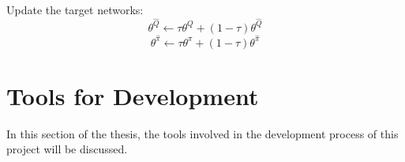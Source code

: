 \documentclass[12pt,twoside,a4]{mwbk}
\begin{document}
\begin{algorithm}
\begin{algorithmic}[1]
\begin{equation*}
                \end{equation*}
                \State Update the target networks:
                \begin{equation*}
                \theta^{\hat{Q}} \leftarrow \tau \theta^{Q} + (1 - \tau) \theta^{\hat{Q}}
                \end{equation*}
                \begin{equation*}
                \theta^{\hat{\pi}} \leftarrow \tau \theta^{\pi} + (1 - \tau) \theta^{\hat{\pi}}
                \end{equation*}
            \EndFor 
        \EndFor
\end{algorithmic}
\end{algorithm}

\section{Tools for Development}
In this section of the thesis, the tools involved in the development process of this project will be discussed.
\end{document}
